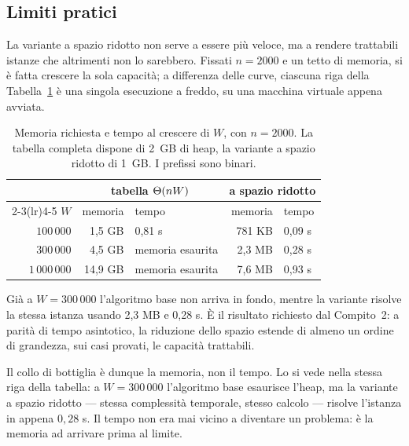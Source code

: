 \documentclass[11pt]{article}
\begin{document}
\subsection{Limiti pratici}
La variante a spazio ridotto non serve a essere pi\`u veloce, ma a rendere
trattabili istanze che altrimenti non lo sarebbero. Fissati $n = 2000$ e un
tetto di memoria, si \`e fatta crescere la sola capacit\`a; a differenza delle
curve, ciascuna riga della Tabella~\ref{tab:limiti} \`e una singola esecuzione a
freddo, su una macchina virtuale appena avviata.

\begin{table}[htbp]
  \centering
  \caption{Memoria richiesta e tempo al crescere di $W$, con $n = 2000$. La
  tabella completa dispone di 2~GB di heap, la variante a spazio ridotto di
  1~GB. I prefissi sono binari.}
  \label{tab:limiti}
  \smallskip
  \begin{tabular}{rrlrl}
  \toprule
  & \multicolumn{2}{c}{tabella $\Theta(nW)$} & \multicolumn{2}{c}{a spazio ridotto} \\
  \cmidrule(lr){2-3}\cmidrule(lr){4-5}
  $W$ & memoria & tempo & memoria & tempo \\
  \midrule
  $100\,000$    & 1,5 GB  & 0,81 s           & 781 KB & 0,09 s \\
  $300\,000$    & 4,5 GB  & memoria esaurita & 2,3 MB & 0,28 s \\
  $1\,000\,000$ & 14,9 GB & memoria esaurita & 7,6 MB & 0,93 s \\
  \bottomrule
  \end{tabular}
\end{table}

Gi\`a a $W = 300\,000$ l'algoritmo base non arriva in fondo, mentre la variante
risolve la stessa istanza usando 2,3 MB e 0,28 s. \`E il
risultato richiesto dal Compito~2: a parit\`a di tempo asintotico, la riduzione
dello spazio estende di almeno un ordine di grandezza, sui casi provati, le
capacit\`a trattabili.

Il collo di bottiglia \`e dunque la memoria, non il tempo. Lo si vede nella
stessa riga della tabella: a $W = 300\,000$ l'algoritmo base esaurisce l'heap,
ma la variante a spazio ridotto --- stessa complessit\`a temporale, stesso
calcolo --- risolve l'istanza in appena $0{,}28$ s. Il tempo non era mai vicino
a diventare un problema: \`e la memoria ad arrivare prima al limite.
\end{document}
